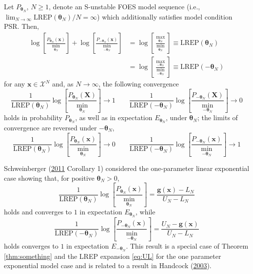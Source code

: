 \documentclass[]{article}
\theoremstyle{definition}
\newcommand{\REP}{\mathrm{LREP}}
\let\BeginKnitrBlock\begin \let\EndKnitrBlock\end
\begin{document}
\BeginKnitrBlock{theorem}
\protect\hypertarget{thm:something}{}{\label{thm:something}}Let
\(P_{\boldsymbol \theta_N}\), \(N \geq 1\), denote an S-unstable FOES
model sequence (i.e.,
\(\lim_{N\to \infty}\REP(\boldsymbol \theta_N)/N=\infty\)) which
additionally satisfies model condition PSR. Then,
\begin{align*}
\log\left[ \frac{P_{\boldsymbol \theta_N }(\boldsymbol x) }{\min_{\boldsymbol \theta_N}}\right] +  \log\left[ \frac{P_{-\boldsymbol \theta_N }(\boldsymbol x) }{\min_{-\boldsymbol \theta_N}}\right]  &=    \log\left[ \frac{\max_{\boldsymbol \theta_N}}{\min_{\boldsymbol \theta_N}}\right]  \equiv  \REP(\boldsymbol \theta_N)\\
& = \log\left[ \frac{\max_{-\boldsymbol \theta_N} }{\min_{-\boldsymbol \theta_N}}\right] \equiv \REP(-\boldsymbol \theta_N)
\end{align*}
for any \(\boldsymbol x\in\mathcal{X}^N\) and, as \(N\to \infty\), the
following convergence \[
\frac{1}{\REP(\boldsymbol \theta_N)} \log\left[ \frac{P_{\boldsymbol \theta_N }(\boldsymbol X) }{\min_{\boldsymbol \theta_N}}\right]  \rightarrow 1 \qquad \frac{1}{\REP(-\boldsymbol \theta_N)}\log\left[ \frac{P_{-\boldsymbol \theta_N }(\boldsymbol X) }{\min_{-\boldsymbol \theta_N}}\right]  \rightarrow 0
\] holds in probability \(P_{\boldsymbol \theta_N}\), as well as in
expectation \(E_{\boldsymbol \theta_N}\), under
\(\boldsymbol \theta_N\); the limits of convergence are reversed under
\(-\boldsymbol \theta_N\), \[
\frac{1}{\REP(\boldsymbol \theta_N)} \log\left[ \frac{P_{\boldsymbol \theta_N }(\boldsymbol x) }{\min_{\boldsymbol \theta_N}}\right]  \rightarrow 0 \qquad \frac{1}{\REP(-\boldsymbol \theta_N)}\log\left[ \frac{P_{-\boldsymbol \theta_N }(\boldsymbol x) }{\min_{-\boldsymbol \theta_N}}\right]  \rightarrow 1
\]
\EndKnitrBlock{theorem} Schweinberger
(\protect\hyperlink{ref-schweinberger2011instability}{2011} Corollary 1)
considered the one-parameter linear exponential case showing that, for
positive \(\boldsymbol \theta_N>0\), \[
\frac{1}{\REP(\boldsymbol \theta_N)} \log\left[ \frac{P_{\boldsymbol \theta_N }(\boldsymbol x) }{\min_{\boldsymbol \theta_N}}\right] = \frac{\boldsymbol g(\boldsymbol x) - L_N}{U_N-L_N} 
\] holds and converges to \(1\) in expectation
\(E_{\boldsymbol \theta_N}\), while \[   
\frac{1}{\REP(-\boldsymbol \theta_N)} \log\left[ \frac{P_{-\boldsymbol \theta_N }(\boldsymbol x) }{\min_{-\boldsymbol \theta_N}}\right] = \frac{U_N -\boldsymbol g(\boldsymbol x)}{U_N-L_N} 
\] holds converges to \(1\) in expectation
\(E_{-\boldsymbol \theta_N}\). This result is a special case of Theorem
\ref{thm:something} and the LREP expansion \eqref{eq:UL} for the one
parameter exponential model case and is related to a result in Handcock
(\protect\hyperlink{ref-handcock2003assessing}{2003}).
\end{document}
